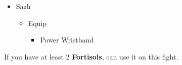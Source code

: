\begin{menu}
\begin{itemize}
\begin{itemize}
\begin{itemize}
\begin{itemize}
            \end{itemize}
        \end{itemize}
        \item Sazh
        \begin{itemize}
            \item Equip
            \begin{itemize}
                \item Power Wristband
            \end{itemize}
        \end{itemize}
    \end{itemize}
\end{itemize}
\end{menu}

\renewcommand{\first}{[1] Slash \& Burn (\rav/\com)}
\renewcommand{\second}{[2] Divide \& Conquer (\sab/\com)}
\renewcommand{\third}{[3] Tide Turner (\sab/\syn)}
\renewcommand{\fourth}{[4] Dualcasting (\rav/\rav)}
\renewcommand{\fifth}{[5] Undermine (\sab/\rav)}
\renewcommand{\sixth}{[6] Divide \& Conquer (\sab/\com)}
\newpage
If you have at least 2 \textbf{Fortisols}, can use it on this fight.
